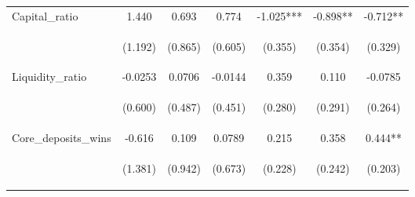 \documentclass[]{article}
\begin{document}
\begin{center}
\begin{tabular}{lcccccc}
Capital\_ratio & 1.440 & 0.693 & 0.774 & -1.025*** & -0.898** & -0.712** \\
\vspace{4pt} & \begin{footnotesize}(1.192)\end{footnotesize} & \begin{footnotesize}(0.865)\end{footnotesize} & \begin{footnotesize}(0.605)\end{footnotesize} & \begin{footnotesize}(0.355)\end{footnotesize} & \begin{footnotesize}(0.354)\end{footnotesize} & \begin{footnotesize}(0.329)\end{footnotesize} \\
Liquidity\_ratio & -0.0253 & 0.0706 & -0.0144 & 0.359 & 0.110 & -0.0785 \\
\vspace{4pt} & \begin{footnotesize}(0.600)\end{footnotesize} & \begin{footnotesize}(0.487)\end{footnotesize} & \begin{footnotesize}(0.451)\end{footnotesize} & \begin{footnotesize}(0.280)\end{footnotesize} & \begin{footnotesize}(0.291)\end{footnotesize} & \begin{footnotesize}(0.264)\end{footnotesize} \\
Core\_deposits\_wins & -0.616 & 0.109 & 0.0789 & 0.215 & 0.358 & 0.444** \\
\vspace{4pt} & \begin{footnotesize}(1.381)\end{footnotesize} & \begin{footnotesize}(0.942)\end{footnotesize} & \begin{footnotesize}(0.673)\end{footnotesize} & \begin{footnotesize}(0.228)\end{footnotesize} & \begin{footnotesize}(0.242)\end{footnotesize} & \begin{footnotesize}(0.203)\end{footnotesize} \\

\end{tabular}
\end{center}
\end{document}
